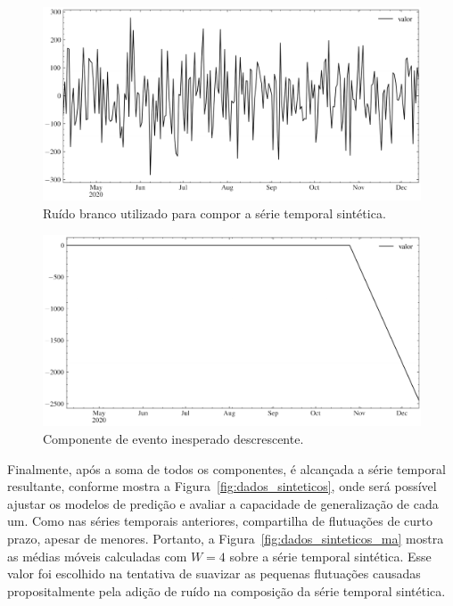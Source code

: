 \begin{figure}[!htp]
    \centering
    \includegraphics[width=5.0in]{img/noise.pdf}
    \caption{Ruído branco utilizado para compor a série temporal sintética.}\label{fig:noise}
\end{figure}

\begin{figure}[!htp]
    \centering
    \includegraphics[width=5.0in]{img/big_event.pdf}
    \caption{Componente de evento inesperado descrescente.}\label{fig:big_event}
\end{figure}

Finalmente, após a soma de todos os componentes, é alcançada a série temporal resultante, conforme mostra a Figura~\ref{fig:dados_sinteticos}, onde será possível ajustar os modelos de predição e avaliar a capacidade de generalização de cada um. Como nas séries temporais anteriores, compartilha de flutuações de curto prazo, apesar de menores. Portanto, a Figura~\ref{fig:dados_sinteticos_ma} mostra as médias móveis calculadas com $W=4$ sobre a série temporal sintética. Esse valor foi escolhido na tentativa de suavizar as pequenas flutuações causadas propositalmente pela adição de ruído na composição da série temporal sintética.

